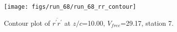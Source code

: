 \begin{figure}[H]
\centering
\texttt{[image: figs/run\_68/run\_68\_rr\_contour]}
\caption{Contour plot of $\overline{r^\prime r^\prime}$ at $z/c$=10.00, $V_{free}$=29.17, station 7.}
\end{figure}


